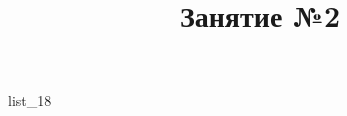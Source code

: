 \documentclass[12pt, a4paper]{article}
\begin{document}
	\title{Занятие №2}
	{list_18}
\end{document}
